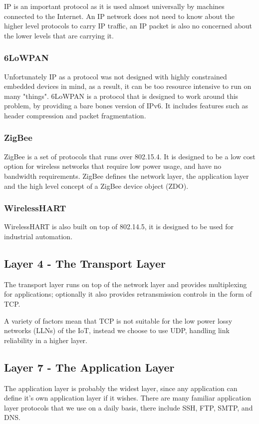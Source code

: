\documentclass[12pt,journal,compsoc]{IEEEtran}
\begin{document}
IP is an important protocol as it is used almost universally by machines
connected to the Internet. An IP network does not need to know about the higher
level protocols to carry IP traffic, an IP packet is also no concerned about
the lower levels that are carrying it. 

\subsubsection{6LoWPAN}
Unfortunately IP as a protocol was not designed with highly constrained
embedded devices in mind, as a result, it can be too resource intensive to run
on many "things". 6LoWPAN is a protocol that is designed to work around this
problem, by providing a bare bones version of IPv6. It includes features such
as header compression and packet fragmentation.  

\subsubsection{ZigBee}
ZigBee is a set of protocols that runs over 802.15.4. It is designed to be a
low cost option for wireless networks that require low power usage, and have no
bandwidth requirements. ZigBee defines the network layer, the application layer
and the high level concept of a ZigBee device object (ZDO). 

\subsubsection{WirelessHART}
WirelessHART is also built on top of 802.14.5, it is designed to be used for
industrial automation. 

\subsection{Layer 4 - The Transport Layer}
The transport layer runs on top of the network layer and provides multiplexing
for applications; optionally it also provides retransmission controls in
the form of TCP. 

A variety of factors mean that TCP is not suitable for the low power lossy
networks (LLNs) of the IoT, instead we choose to use UDP, handling link
reliability in a higher layer.

\subsection{Layer 7 - The Application Layer}
The application layer is probably the widest layer, since any application can
define it's own application layer if it wishes. There are many familiar
application layer protocols that we use on a daily basis, there include SSH,
FTP, SMTP, and DNS. 
\end{document}

